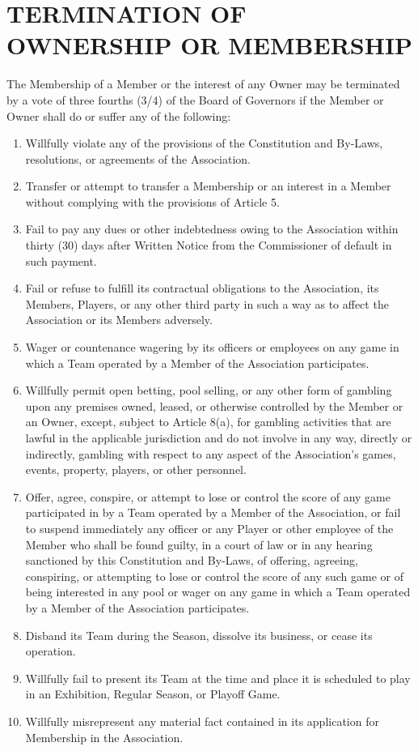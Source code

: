 \documentclass[]{book}
\providecommand{\tightlist}{%
  \setlength{\itemsep}{0pt}\setlength{\parskip}{0pt}}
\begin{document}
\hypertarget{termination-of-ownership-or-membership}{%
\section{TERMINATION OF OWNERSHIP OR MEMBERSHIP}\label{termination-of-ownership-or-membership}}

The Membership of a Member or the interest of any Owner may be terminated by a vote of three fourths (3/4) of the Board of Governors if the Member or Owner shall do or suffer any of the following:

\begin{enumerate}
\def\labelenumi{(\alph{enumi})}
\tightlist
\item
  Willfully violate any of the provisions of the Constitution and By-Laws, resolutions, or agreements of the Association.
\item
  Transfer or attempt to transfer a Membership or an interest in a Member without complying with the provisions of Article 5.
\item
  Fail to pay any dues or other indebtedness owing to the Association within thirty (30) days after Written Notice from the Commissioner of default in such payment.
\item
  Fail or refuse to fulfill its contractual obligations to the Association, its Members, Players, or any other third party in such a way as to affect the Association or its Members adversely.
\item
  Wager or countenance wagering by its officers or employees on any game in which a Team operated by a Member of the Association participates.
\item
  Willfully permit open betting, pool selling, or any other form of gambling upon any premises owned, leased, or otherwise controlled by the Member or an Owner, except, subject to Article 8(a), for gambling activities that are lawful in the applicable jurisdiction and do not involve in any way, directly or indirectly, gambling with respect to any aspect of the Association's games, events, property, players, or other personnel.
\item
  Offer, agree, conspire, or attempt to lose or control the score of any game participated in by a Team operated by a Member of the Association, or fail to suspend immediately any officer or any Player or other employee of the Member who shall be found guilty, in a court of law or in any hearing sanctioned by this Constitution and By-Laws, of offering, agreeing, conspiring, or attempting to lose or control the score of any such game or of being interested in any pool or wager on any game in which a Team operated by a Member of the Association participates.
\item
  Disband its Team during the Season, dissolve its business, or cease its operation.
\item
  Willfully fail to present its Team at the time and place it is scheduled to play in an Exhibition, Regular Season, or Playoff Game.
\item
  Willfully misrepresent any material fact contained in its application for Membership in the Association.
\end{enumerate}
\end{document}

